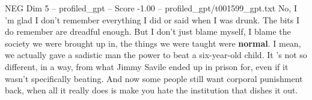 \begin{textsample}{NEG Dim 5 – profiled\_gpt – Score -1.00 – profiled\_gpt/t001599\_gpt.txt}  \label{ex:f5_neg_025}
No, I ’m glad I don't remember everything I did or said when I was drunk.
The bits I do remember are dreadful enough.
But I don't just blame myself, I blame the society we were brought up in, the things we were taught were \textbf{normal}.
I mean, we actually gave a sadistic man the power to beat a six-year-old child.
It ’s not so different, in a way, from what Jimmy Savile ended up in prison for, even if it wasn't specifically beating.
And now some people still want corporal punishment back, when all it really does is make you hate the institution that dishes it out.

\end{textsample}
